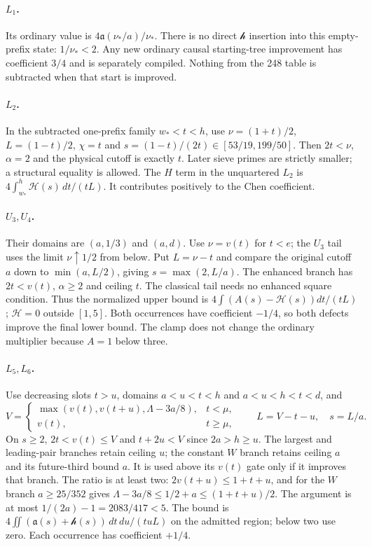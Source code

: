 \documentclass[11pt]{article}
\newcommand{\HH}{\mathcal H}
\newcommand{\hh}{\mathcal h}
\newcommand{\aa}{\mathfrak a}
\begin{document}
\paragraph{$L_1$.}
Its ordinary value is $4\aa(\nu_*/a)/\nu_*$. There is no direct
$\hh$ insertion into this empty-prefix state: $1/\nu_*<2$.
Any new ordinary causal starting-tree improvement has coefficient
$3/4$ and is separately compiled. Nothing from the 248 table is
subtracted when that start is improved.

\paragraph{$L_2$.}
In the subtracted one-prefix family $w_*<t<h$, use
$\nu=(1+t)/2$, $L=(1-t)/2$, $\chi=t$ and
$s=(1-t)/(2t)\in[53/19,199/50]$. Then $2t<\nu$, $\alpha=2$
and the physical cutoff is exactly $t$. Later sieve primes are strictly
smaller; a structural equality is allowed. The $H$ term in the
unquartered $L_2$ is $4\int_{w_*}^h\HH(s)\,dt/(tL)$.
It contributes positively to the Chen coefficient.

\paragraph{$U_3,U_4$.}
Their domains are $(a,1/3)$ and $(a,d)$. Use $\nu=v(t)$ for
$t<e$; the $U_3$ tail uses the limit $\nu\uparrow1/2$ from below.
Put $L=\nu-t$ and compare the original cutoff $a$ down to
$\min(a,L/2)$, giving $s=\max(2,L/a)$. The enhanced branch has
$2t<v(t)$, $\alpha\ge2$ and ceiling $t$. The classical tail needs
no enhanced square condition. Thus the normalized upper bound is
$4\int(A(s)-\HH(s))dt/(tL)$; $\HH=0$ outside $[1,5]$.
Both occurrences have coefficient $-1/4$, so both defects improve
the final lower bound. The clamp does not change the ordinary
multiplier because $A=1$ below three.

\paragraph{$L_5,L_6$.}
Use decreasing slots $t>u$, domains $a<u<t<h$ and $a<u<h<t<d$,
and
\[
 V=\begin{cases}\max(v(t),v(t+u),\Lambda-3a/8),&t<\mu,\\
 v(t),&t\ge\mu,\end{cases}\qquad L=V-t-u,\quad s=L/a.
\]
On $s\ge2$, $2t<v(t)\le V$ and $t+2u<V$ since $2a>h\ge u$.
The largest and leading-pair branches retain ceiling $u$; the constant
$W$ branch retains ceiling $a$ and its future-third bound $a$.
It is used above its $v(t)$ gate only if it improves that branch.
The ratio is at least two: $2v(t+u)\le1+t+u$, and for the $W$
branch $a\ge25/352$ gives $\Lambda-3a/8\le1/2+a\le(1+t+u)/2$.
The argument is at most $1/(2a)-1=2083/417<5$.
The bound is
$4\iint(\aa(s)+\hh(s))\,dt\,du/(tuL)$ on the admitted region;
below two use zero. Each occurrence has coefficient $+1/4$.
\end{document}
